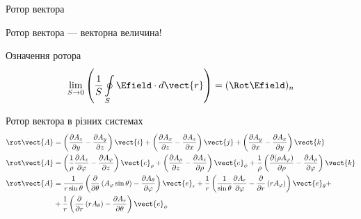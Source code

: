 \documentclass{beamer}
\begin{document}
\begin{frame}{Ротор вектора}{}\small
	\begin{alertblock}{}\centering
		Ротор вектора --- векторна величина!
	\end{alertblock}

	\begin{block}{\small Означення ротора}
		\begin{equation*}
			\lim\limits_{S\to0} \left( \frac1S \oint\limits_S \Efield\cdot
			d\vect{r}\right)  =
			(\Rot\Efield)_n
		\end{equation*}
	\end{block}

	\begin{block}{Ротор вектора в різних системах}
		\begin{align*}
			\rot\vect{A} & = \left( \frac{\partial A_z}{\partial y}  - \frac{\partial A_y}{\partial
				z}\right)  \vect{i} +
			\left( \frac{\partial A_x}{\partial z}  - \frac{\partial A_z}{\partial x}\right)  \vect{j} +
			\left( \frac{\partial A_y}{\partial x}  - \frac{\partial A_x}{\partial y}\right)  \vect{k} \\
			\rot\vect{A} & =\left({\frac {1}{\rho }}{\frac {\partial A_{z}}{\partial \varphi }}-{\frac
				{\partial A_{\varphi }}{\partial z}}\right)\vect{e}_{\rho}+\left({\frac {\partial A_{\rho
					}}{\partial z}}-{\frac {\partial A_{z}}{\partial \rho }}\right)\vect{e}_{\phi} +
			{\frac {1}{\rho }}\left({\frac {\partial (\rho A_{\varphi })}{\partial \rho }}-{\frac {\partial
			A_{\rho }}{\partial \varphi }}\right)\vect{k}                                              \\
			\rot\vect{A} & = \frac{1}{r\sin \theta }\left(\frac{\partial}{\partial \theta
			}\left(A_{\varphi }\sin \theta \right)-\frac{\partial A_{\theta }}{\partial \varphi
			}\right)\vect{e}_{r}
			+
			\frac{1}{r}\left(\frac{1}{\sin \theta }\frac{\partial A_{r}}{\partial \varphi
			}-\frac{\partial}{\partial r}\left(rA_{\varphi }\right)\right)\vect{e}_{\theta}
			+
			\nonumber
			\\
			             & + \frac{1}{r}\left(\frac{\partial}{\partial r}\left(rA_{\theta
			}\right)-\frac{\partial A_{r}}{\partial \theta }\right)\vect{e}_{\phi}
		\end{align*}
	\end{block}
\end{frame}
\end{document}
